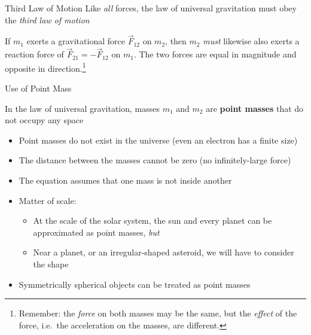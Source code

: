 \documentclass[12pt,compress,aspectratio=169]{beamer}
\begin{document}
\begin{frame}{Third Law of Motion}
  Like \emph{all} forces, the law of universal gravitation must obey the
  \emph{third law of motion}
  \begin{center}
  \end{center}
  If $m_1$ exerts a gravitational force $\vec F_{12}$ on $m_2$, then $m_2$
  \emph{must} likewise also exerts a reaction force of $\vec F_{21}=-\vec F_{12}$
  on $m_1$. The two forces are equal in magnitude and opposite in
  direction.\footnote{Remember: the \emph{force} on both masses may be the
  same, but the \emph{effect} of the force, i.e.\ the acceleration on the
  masses, are different.}
\end{frame}



\begin{frame}{Use of Point Mass}


  In the law of universal gravitation, masses $m_1$ and $m_2$ are
  \textbf{point masses} that do not occupy any space
  \begin{itemize}
  \item Point masses do not exist in the universe (even an electron has a finite
    size)
  \item The distance between the masses cannot be zero (no infinitely-large
    force)
  \item The equation assumes that one mass is not inside another
  \item Matter of scale:
    \begin{itemize}
    \item At the scale of the solar system, the sun and every planet can be
      approximated as point masses, \emph{but}
    \item Near a planet, or an irregular-shaped asteroid, we will have to
      consider the shape
    \end{itemize}
  \item Symmetrically spherical objects %
    can be treated as point masses
  \end{itemize}
\end{frame}
    
\end{document}
